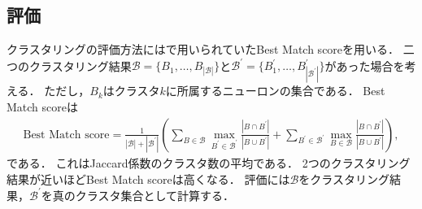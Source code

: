 \subsection{評価}
クラスタリングの評価方法には\cite{Molter2018}で用いられていたBest Match scoreを用いる．
二つのクラスタリング結果$\mathcal{B} = \{B_1, \dots, B_{|\mathcal{B}|}\}$と$\mathcal{B^\prime} = \{B^\prime_1, \dots, B^\prime_{|\mathcal{B}^\prime|}\}$があった場合を考える．
ただし，$B_k$はクラスタ$k$に所属するニューロンの集合である．
Best Match scoreは
\begin{align}
	\text{Best Match score} = \frac{1}{|\mathcal{B}| + |\mathcal{B^\prime}|} \left( \sum_{B \in \mathcal{B}} \max_{B^\prime \in \mathcal{B^\prime}} \frac{|B \cap B^\prime|}{|B \cup B^\prime|} + \sum_{B^\prime \in \mathcal{B^\prime}} \max_{B \in \mathcal{B}} \frac{|B \cap B^\prime|}{|B \cup B^\prime|} \right),
\end{align}
である．
これはJaccard係数のクラスタ数の平均である．
2つのクラスタリング結果が近いほどBest Match scoreは高くなる．
評価には$\mathcal{B}$をクラスタリング結果，$\mathcal{B}^\prime$を真のクラスタ集合として計算する．
